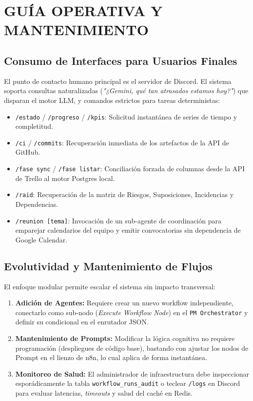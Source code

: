 \documentclass{encabezado}
\begin{document}
\section{GUÍA OPERATIVA Y MANTENIMIENTO}

\subsection{Consumo de Interfaces para Usuarios Finales}

El punto de contacto humano principal es el servidor de Discord. El sistema soporta consultas naturalizadas (\textit{"¿Gemini, qué tan atrasados estamos hoy?"}) que disparan el motor LLM, y comandos estrictos para tareas deterministas:

\begin{itemize}
    \item \texttt{/estado} / \texttt{/progreso} / \texttt{/kpis}: Solicitud instantánea de series de tiempo y completitud.
    \item \texttt{/ci} / \texttt{/commits}: Recuperación inmediata de los artefactos de la API de GitHub.
    \item \texttt{/fase sync} / \texttt{/fase listar}: Conciliación forzada de columnas desde la API de Trello al motor Postgres local.
    \item \texttt{/raid}: Recuperación de la matriz de Riesgos, Suposiciones, Incidencias y Dependencias.
    \item \texttt{/reunion [tema]}: Invocación de un sub-agente de coordinación para emparejar calendarios del equipo y emitir convocatorias sin dependencia de Google Calendar.
\end{itemize}

\subsection{Evolutividad y Mantenimiento de Flujos}

El enfoque modular permite escalar el sistema sin impacto transversal:
\begin{enumerate}
    \item \textbf{Adición de Agentes:} Requiere crear un nuevo workflow independiente, conectarlo como sub-nodo (\textit{Execute Workflow Node}) en el \texttt{PM Orchestrator} y definir su condicional en el enrutador JSON.
    \item \textbf{Mantenimiento de Prompts:} Modificar la lógica cognitiva no requiere programación (despliegues de código base), bastando con ajustar los nodos de Prompt en el lienzo de n8n, lo cual aplica de forma instantánea.
    \item \textbf{Monitoreo de Salud:} El administrador de infraestructura debe inspeccionar esporádicamente la tabla \texttt{workflow\_runs\_audit} o teclear \texttt{/logs} en Discord para evaluar latencias, \textit{timeouts} y salud del caché en Redis.
\end{enumerate}
\end{document}

